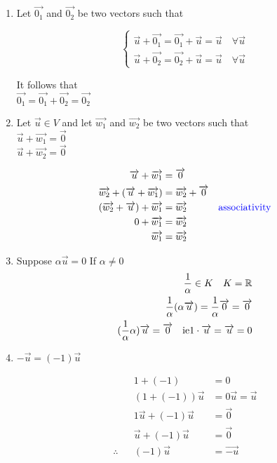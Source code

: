 \documentclass[12pt]{article}
\newcommand{\mathcomment}[0]{\quad\color{blue}}
\renewcommand{\v}[1]{\overrightarrow{#1}}
\newcommand{\real}[0]{\mathbb{R}}
\begin{document}
\begin{enumerate}
	\item Let $\v{0_1}$ and $\v{0_2}$ be two vectors such that
	
	
	\begin{equation}
	\begin{cases}
		\v{u} + \v{0_1} = \v{0_1} + \v{u} = \v{u} \quad \forall \v{u} \\
		\v{u} + \v{0_2} = \v{0_2} + \v{u} = \v{u} \quad \forall \v{u}
	\end{cases}
	\end{equation}
	
	It follows that \\
	$\v{0_1} = \v{0_1} + \v{0_2} = \v{0_2}$
	
	\item Let $\v{u} \in V$ and let $\v{w_1}$ and $\v{w_2}$ be two vectors such that \\
	$\v{u} + \v{w_1} = \v{0}$ \\
	$\v{u} + \v{w_2} = \v{0}$
	
	\begin{equation}
		\begin{alignedat}{2}
			\v{u} + \v{w_1} &= \v{0} &\\
			\v{w_2} + (\v{u} + \v{w_1}) &= \v{w_2} + \v{0} &\\
			(\v{w_2} + \v{u}) + \v{w_1} &= \v{w_2} & \mathcomment \text{associativity}\\
			0 + \v{w_1} &= \v{w_2} &\\
			\v{w_1} &= \v{w_2} &
		\end{alignedat}
	\end{equation}
	
	\item Suppose $\alpha \v{u} = 0$ 
	If $\alpha \ne 0$ \\
	
	\begin{equation}
		\begin{alignedat}{2}
			\frac{1}{\alpha} \in K \quad K = \real \\
			\frac{1}{\alpha} (\alpha \v{u}) = \frac{1}{\alpha} \v{0} = \v{0} \\
			(\frac{1}{\alpha} \alpha) \v{u} = \v{0} \text{\quad ie} 1 \cdot \v{u} = \v{u} = 0
		\end{alignedat}
	\end{equation}
	
	\item $-\v{u} = (-1) \v{u}$
	
	\begin{equation}
		\begin{alignedat}{2}
			&& 1 + (-1) &= 0 \\
			&& (1 + (-1)) \v{u} &= 0 \v{u} = \v{u} \\
			&& 1 \v{u} + (-1) \v{u} &= \v{0} \\
			&& \v{u} + (-1) \v{u} &= \v{0} \\
			\therefore && (-1) \v{u} &= \v{-u}
		\end{alignedat}
	\end{equation}
	
\end{enumerate}
\end{document}
